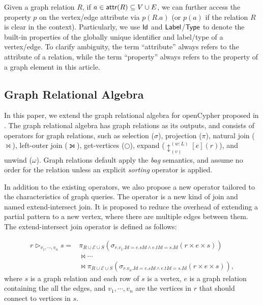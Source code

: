 Given a graph relation $R$, if $a \in {\ensuremath {\mathsf{attr}}}(R) \subseteq V \cup E$, we can further access the property $p$ on the vertex/edge attribute via $p(R.a)$ (or $p(a)$ if the relation $R$ is clear in the context). 
Particularly, we use ${\mathsf{Id}}$ and ${\mathsf{Label}}$/${\mathsf{Type}}$ to denote the built-in properties of the globally unique identifier and label/type of a vertex/edge. 
To clarify ambiguity, the term ``attribute'' always refers to the attribute of a relation, while the term ``property'' always refers to the property of a graph element in this article.


\subsection{Graph Relational Algebra}

In this paper, we extend the graph relational algebra for openCypher proposed in \cite{}.
The graph relational algebra has graph relations as its outputs, and consists of operators for graph relations, such as selection ($\sigma$), projection ($\pi$), natural join ($\Join$), left-outer join ($\leftouterjoin$), get-vertices ($\bigcirc$), expand ($\updownarrow^{(w:L)}_{(v)}[e](r)$), and unwind ($\omega$).
Graph relations default apply the \emph{bag} semantics, and assume no order for the relation unless an explicit \emph{sorting} operator is applied.


In addition to the existing operators, we also propose a new operator tailored to the characteristics of graph queries.
The operator is a new kind of join and named extend-intersect join.
It is proposed to reduce the overhead of extending a partial pattern to a new vertex, where there are multiple edges between them.
The extend-intersect join operator is defined as follows:

\begin{equation}
    \begin{split}
        r \rhd_{v_1, \cdots, v_n} s = & \pi_{R \cup \mathcal{E} \cup S}(\sigma_{r.v_1.Id = e.sId \land e.tId = s.Id}(r \times e \times s)) \\
        & \Join \cdots \\
        & \Join \pi_{R \cup \mathcal{E} \cup S}(\sigma_{r.v_n.Id = e.sId \land e.tId = s.Id}(r \times e \times s)),
    \end{split}
\end{equation}
where $s$ is a graph relation and each row of $s$ is a vertex,
$e$ is a graph relation containing the all the edges,
and $v_1, \cdots, v_n$ are the vertices in $r$ that should connect to vertices in $s$.

